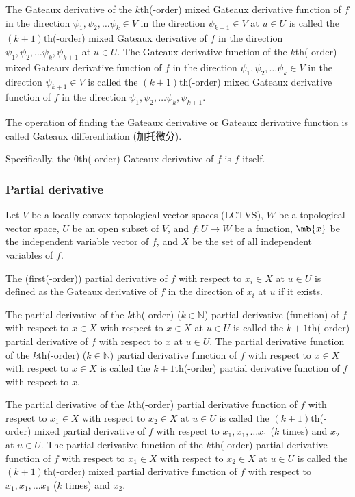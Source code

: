 \documentclass[a4paper,12pt]{report}
\begin{document}
\begin{itemize}
\begin{itemize}
The Gateaux derivative of the $k$th(-order) mixed Gateaux derivative function of $f$ in the direction $\psi_1,\psi_2,\dots \psi_k\in V$ in the direction $\psi_{k+1}\in V$ at $u\in U$ is called the $(k+1)$th(-order) mixed Gateaux derivative of $f$ in the direction $\psi_1,\psi_2,\dots \psi_k,\psi_{k+1}$ at $u\in U$. The Gateaux derivative function of the $k$th(-order) mixed Gateaux derivative function of $f$ in the direction $\psi_1,\psi_2,\dots \psi_k\in V$ in the direction $\psi_{k+1}\in V$ is called the $(k+1)$th(-order) mixed Gateaux derivative function of $f$ in the direction $\psi_1,\psi_2,\dots \psi_k,\psi_{k+1}$.

The operation of finding the Gateaux derivative or Gateaux derivative function is called Gateaux differentiation (加托微分).

Specifically, the $0$th(-order) Gateaux derivative of $f$ is $f$ itself.
\subsubsection{Partial derivative}
Let $V$ be a locally convex topological vector spaces (LCTVS), $W$ be a topological vector space, $U$ be an open subset of $V$, and $f\colon U\to W$ be a function, $\mb{x}$ be the independent variable vector of $f$, and $X$ be the set of all independent variables of $f$.

The (first(-order)) partial derivative of $f$ with respect to $x_i\in X$ at $u\in U$ is defined as the Gateaux derivative of $f$ in the direction of $x_i$ at $u$ if it exists.

The partial derivative of the $k$th(-order) ($k\in\mathbb{N}$) partial derivative (function) of $f$ with respect to $ x \in X$ with respect to $ x \in X$ at $u\in U$ is called the $k+1$th(-order) partial derivative of $f$ with respect to $ x$ at $u\in U$. The partial derivative function of the $k$th(-order) ($k\in\mathbb{N}$) partial derivative function of $f$ with respect to $ x \in X$ with respect to $ x \in X$ is called the $k+1$th(-order) partial derivative function of $f$ with respect to $ x$.

The partial derivative of the $k$th(-order) partial derivative function of $f$ with respect to $ x_1\in X$ with respect to $ x_2\in X$ at $u\in U$ is called the $(k+1)$th(-order) mixed partial derivative of $f$ with respect to $ x_1, x_1,\dots  x_1$ ($k$ times) and $ x_2$ at $u\in U$. The partial derivative function of the $k$th(-order) partial derivative function of $f$ with respect to $ x_1\in X$ with respect to $ x_2\in X$ at $u\in U$ is called the $(k+1)$th(-order) mixed partial derivative function of $f$ with respect to $ x_1, x_1,\dots  x_1$ ($k$ times) and $ x_2$.


\end{itemize}
\end{itemize}
\end{document}

